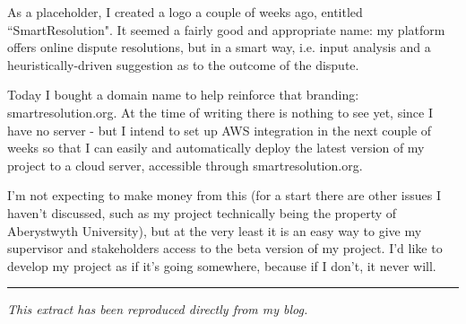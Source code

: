 As a placeholder, I created a logo a couple of weeks ago, entitled ``SmartResolution". It seemed a fairly good and appropriate name: my platform offers online dispute resolutions, but in a smart way, i.e. input analysis and a heuristically-driven suggestion as to the outcome of the dispute.

Today I bought a domain name to help reinforce that branding: smartresolution.org. At the time of writing there is nothing to see yet, since I have no server - but I intend to set up AWS integration in the next couple of weeks so that I can easily and automatically deploy the latest version of my project to a cloud server, accessible through smartresolution.org.

I'm not expecting to make money from this (for a start there are other issues I haven't discussed, such as my project technically being the property of Aberystwyth University), but at the very least it is an easy way to give my supervisor and stakeholders access to the beta version of my project. I'd like to develop my project as if it's going somewhere, because if I don't, it never will.

\rule{\textwidth}{1pt}

\emph{This extract has been reproduced directly from my blog.~\cite{appendix:commercialViability}}